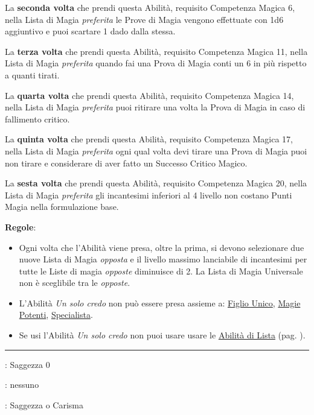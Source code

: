 \begin{multicols}{2}
La \textbf{seconda volta} che prendi questa Abilità, requisito Competenza Magica 6, nella Lista di Magia \emph{preferita} le Prove di Magia vengono effettuate con 1d6 aggiuntivo e puoi scartare 1 dado dalla stessa.

La \textbf{terza volta} che prendi questa Abilità, requisito Competenza Magica 11, nella Lista di Magia \emph{preferita} quando fai una Prova di Magia conti un 6 in più rispetto a quanti tirati.

La \textbf{quarta volta} che prendi questa Abilità, requisito Competenza Magica 14, nella Lista di Magia \emph{preferita} puoi ritirare una volta la Prova di Magia in caso di fallimento critico.

La \textbf{quinta volta} che prendi questa Abilità, requisito Competenza Magica 17, nella Lista di Magia \emph{preferita} ogni qual volta devi tirare una Prova di Magia puoi non tirare e considerare di aver fatto un Successo Critico Magico.

La \textbf{sesta volta} che prendi questa Abilità, requisito Competenza Magica 20, nella Lista di Magia \emph{preferita} gli incantesimi inferiori al 4 livello non costano Punti Magia nella formulazione base.

\medskip

\textbf{Regole}:

\smallskip

\begin{itemize}[leftmargin=*] \setlength{\itemsep}{0pt}
\item Ogni volta che l'Abilità viene presa, oltre la prima, si devono selezionare due nuove Lista di Magia \emph{opposta} e il livello massimo lanciabile di incantesimi per tutte le Liste di magia \emph{opposte} diminuisce di 2.  La Lista di Magia Universale non è sceglibile tra le \emph{opposte}.

\item L'Abilità \emph{Un solo credo} non può essere presa assieme a: \hyperlink{figliounico}{Figlio Unico}, \hyperlink{magiepotenti}{Magie Potenti}, \hyperlink{specialista}{Specialista}.

\item Se usi l'Abilità \emph{Un solo credo} non puoi usare usare le \hyperlink{abilitadilista}{Abilità di Lista} (pag. \pageref{abilitadilista}).
\end{itemize}

\smallskip\noindent\rule{\linewidth}{2pt} \hypertarget{Volonta' Ferrea}{}\medskip{}
\noindent
\begin{description}[noitemsep, topsep=0pt, parsep=0pt, partopsep=0pt, leftmargin=0cm, labelwidth=2.5cm]
    \item[\textbf{Requisito}]: Saggezza 0
    \item[\textbf{Tiri Salvezza}]: nessuno
    \item[\textbf{Caratteristica}]: Saggezza o Carisma
\end{description}


\end{multicols}
